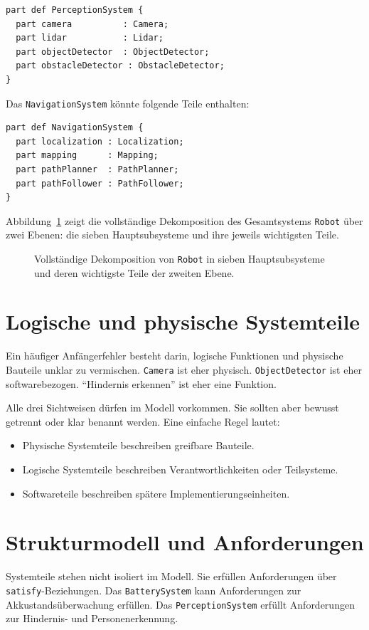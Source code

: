 \begin{lstlisting}
part def PerceptionSystem {
  part camera          : Camera;
  part lidar           : Lidar;
  part objectDetector  : ObjectDetector;
  part obstacleDetector : ObstacleDetector;
}
\end{lstlisting}

Das \texttt{NavigationSystem} könnte folgende Teile enthalten:

\begin{lstlisting}
part def NavigationSystem {
  part localization : Localization;
  part mapping      : Mapping;
  part pathPlanner  : PathPlanner;
  part pathFollower : PathFollower;
}
\end{lstlisting}

Abbildung~\ref{fig:kap08-part-def-baum} zeigt die vollständige Dekomposition des Gesamtsystems \texttt{Robot} über zwei Ebenen: die sieben Hauptsubsysteme und ihre jeweils wichtigsten Teile.

\begin{figure}[H]
  \centering
  \caption{Vollständige Dekomposition von \texttt{Robot} in sieben Hauptsubsysteme und deren wichtigste Teile der zweiten Ebene.}
  \label{fig:kap08-part-def-baum}
\end{figure}

\section{Logische und physische Systemteile}
Ein häufiger Anfängerfehler besteht darin, logische Funktionen und physische Bauteile unklar zu vermischen. \texttt{Camera} ist eher physisch. \texttt{ObjectDetector} ist eher softwarebezogen. \enquote{Hindernis erkennen} ist eher eine Funktion.

Alle drei Sichtweisen dürfen im Modell vorkommen. Sie sollten aber bewusst getrennt oder klar benannt werden. Eine einfache Regel lautet:

\begin{itemize}
    \item Physische Systemteile beschreiben greifbare Bauteile.
    \item Logische Systemteile beschreiben Verantwortlichkeiten oder Teilsysteme.
    \item Softwareteile beschreiben spätere Implementierungseinheiten.
\end{itemize}

\section{Strukturmodell und Anforderungen}
Systemteile stehen nicht isoliert im Modell. Sie erfüllen Anforderungen über \texttt{satisfy}-Beziehungen. Das \texttt{BatterySystem} kann Anforderungen zur Akkustandsüberwachung erfüllen. Das \texttt{PerceptionSystem} erfüllt Anforderungen zur Hindernis- und Personenerkennung.

